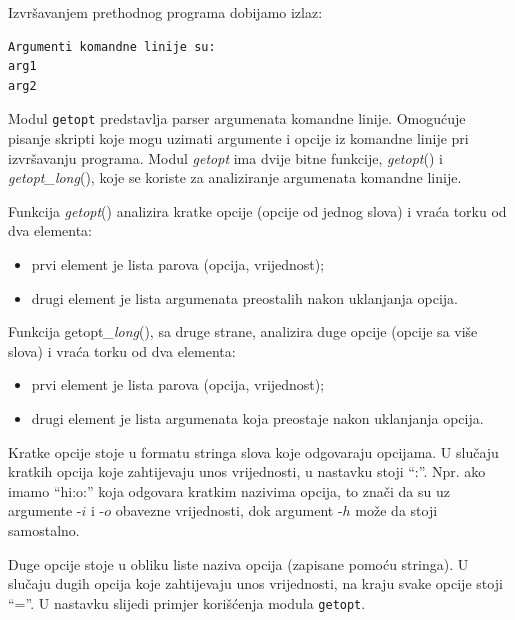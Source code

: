 Izvršavanjem prethodnog programa dobijamo izlaz:
\begin{verbatim}
Argumenti komandne linije su:
arg1
arg2
\end{verbatim}

Modul \texttt{getopt} predstavlja parser argumenata komandne linije. Omogućuje  pisanje skripti koje mogu uzimati argumente i opcije iz komandne linije pri izvršavanju programa. Modul \textit{getopt} ima dvije bitne funkcije, \textit{getopt}() i \textit{getopt\_long}(), koje se koriste za analiziranje argumenata komandne linije. 

Funkcija \textit{getopt}() analizira kratke opcije (opcije od jednog slova) i vraća torku od dva elementa:

\begin{itemize}
	\item prvi element je lista parova (opcija, vrijednost); 
	\item drugi element je lista argumenata preostalih nakon uklanjanja opcija.
\end{itemize} 
 
Funkcija getopt\textit{\_long}(), sa druge strane, analizira duge opcije (opcije sa više slova) i vraća torku od dva elementa: 
\begin{itemize}
	\item  prvi element je lista parova (opcija, vrijednost);
	\item  drugi element je lista argumenata koja preostaje nakon uklanjanja opcija.
\end{itemize}

Kratke opcije stoje u formatu stringa slova koje odgovaraju opcijama. 
U slučaju kratkih opcija koje zahtijevaju unos vrijednosti, u nastavku stoji ``:''. 
Npr. ako imamo ``hi:o:'' koja odgovara kratkim nazivima opcija, to znači da su uz argumente -$i$ i -$o$ obavezne vrijednosti, dok argument -$h$ može da stoji samostalno. 
  
Duge opcije stoje u obliku liste naziva opcija (zapisane pomoću stringa). 
U slučaju dugih opcija koje zahtijevaju unos vrijednosti, na kraju svake opcije stoji ``=''.  U nastavku slijedi primjer korišćenja modula \texttt{getopt}.

